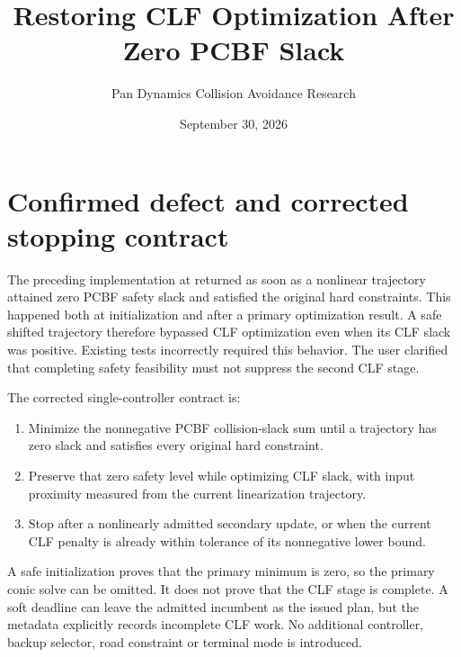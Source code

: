 \documentclass[11pt]{article}
\title{Restoring CLF Optimization After Zero PCBF Slack}
\author{Pan Dynamics Collision Avoidance Research}
\date{September 30, 2026}
\begin{document}
\maketitle
\section{Confirmed defect and corrected stopping contract}
The preceding implementation at
returned as soon as a nonlinear trajectory attained zero PCBF safety slack and
satisfied the original hard constraints. This happened both at initialization
and after a primary optimization result. A safe shifted trajectory therefore
bypassed CLF optimization even when its CLF slack was positive. Existing tests
incorrectly required this behavior. The user clarified that completing safety
feasibility must not suppress the second CLF stage.

The corrected single-controller contract is:
\begin{enumerate}
\item Minimize the nonnegative PCBF collision-slack sum until a trajectory has
zero slack and satisfies every original hard constraint.
\item Preserve that zero safety level while optimizing CLF slack, with input
proximity measured from the current linearization trajectory.
\item Stop after a nonlinearly admitted secondary update, or when the current
CLF penalty is already within tolerance of its nonnegative lower bound.
\end{enumerate}
A safe initialization proves that the primary minimum is zero, so the primary
conic solve can be omitted. It does not prove that the CLF stage is complete.
A soft deadline can leave the admitted incumbent as the issued plan, but the
metadata explicitly records incomplete CLF work. No additional controller,
backup selector, road constraint or terminal mode is introduced.
\end{document}
